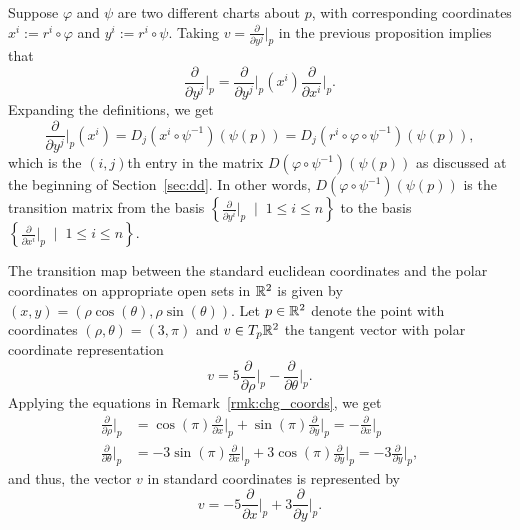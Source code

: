 \begin{remark}\label{rmk:chg_coords}
  Suppose $\varphi$ and $\psi$ are two different charts about $p$, with corresponding coordinates $x^i := r^i \circ \varphi$ and $y^i := r^i \circ \psi$.
  Taking $v = \frac{\partial}{\partial y^j}\Big|_p$ in the previous proposition implies that
  \begin{equation}
    \frac{\partial}{\partial y^j}\Big|_p = 
    \frac{\partial}{\partial y^j}\Big|_p (x^i) \frac{\partial}{\partial x^i}\Big|_p.
  \end{equation}
  Expanding the definitions, we get
  \begin{equation}
    \frac{\partial}{\partial y^j}\Big|_p (x^i) =
    D_j(x^i\circ\psi^{-1})(\psi(p)) =
    D_j(r^i \circ \varphi \circ \psi^{-1})(\psi(p)),
  \end{equation}
  which is the $(i,j)$th entry in the matrix $D(\varphi\circ\psi^{-1})(\psi(p))$ as discussed at the beginning of Section~\ref{sec:dd}.
  In other words, $D(\varphi\circ\psi^{-1})(\psi(p))$ is the transition matrix from the basis $\left\{\frac{\partial}{\partial y^i}\Big|_p\;\mid\; 1\leq i\leq n\right\}$ to the basis $\left\{\frac{\partial}{\partial x^i}\Big|_p\;\mid\; 1\leq i\leq n\right\}$.
\end{remark}

\begin{example}
  The transition map between the standard euclidean coordinates and the polar coordinates on appropriate open sets in $\mathbb{R}^2$ is given by $(x,y) = (\rho\cos(\theta), \rho\sin(\theta))$. Let $p\in\mathbb{R}^2$ denote the point with coordinates $(\rho, \theta) = (3, \pi)$ and $v\in T_p\mathbb{R}^2$ the tangent vector with polar coordinate representation
  \begin{equation}
    v = 5\frac{\partial}{\partial \rho}\Big|_p - \frac{\partial}{\partial \theta}\Big|_p.
  \end{equation}
  Applying the equations in Remark~\ref{rmk:chg_coords}, we get
  \begin{align}
    \frac{\partial}{\partial \rho}\Big|_p
    &= \cos(\pi)\frac{\partial}{\partial x}\Big|_p + \sin(\pi)\frac{\partial}{\partial y}\Big|_p = - \frac{\partial}{\partial x}\Big|_p \\
    \frac{\partial}{\partial \theta}\Big|_p
    &= -3\sin(\pi)\frac{\partial}{\partial x}\Big|_p + 3\cos(\pi)\frac{\partial}{\partial y}\Big|_p = -3 \frac{\partial}{\partial y}\Big|_p,
  \end{align}
  and thus, the vector $v$ in standard coordinates is represented by
  \begin{equation}
    v = - 5 \frac{\partial}{\partial x}\Big|_p + 3 \frac{\partial}{\partial y}\Big|_p.
  \end{equation}
\end{example}

